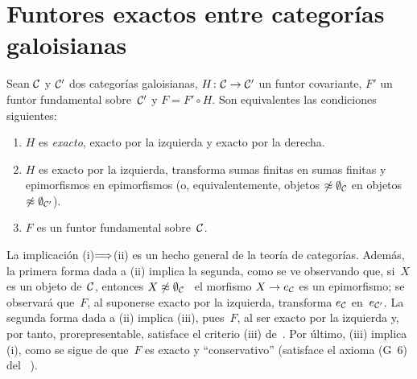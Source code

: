 
\section{Funtores exactos entre categorías galoisianas}
\label{V.6}

\begin{proposition}
\label{V.6.1}
Sean $\cal{C}$ y $\cal{C'}$ dos categorías galoisianas,
$H\colon \cal{C}\to \cal{C'}$ un funtor covariante, $F'$ un funtor
fundamental sobre~$\cal{C'}$ y $F=F'\circ H$. Son equivalentes las
condiciones siguientes:
\begin{enumerate}
\item[(i)] $H$ es \emph{exacto}, \ie exacto por la izquierda y exacto
por la derecha.
\item[(ii)] $H$ es exacto por la izquierda, transforma sumas finitas en
sumas finitas y epimorfismos en epimorfismos (o, equivalentemente,
objetos $\not\approx\emptyset_{\cal C}$ en objetos
$\not\approx\emptyset_{\cal C'}$).
\item[(iii)] $F$ es un funtor fundamental sobre~$\cal C$.
\end{enumerate}
\end{proposition}

La implicación (i)$\To$(ii) es un hecho general de la teoría de categorías. Además,
la primera forma dada a (ii) implica la segunda, como se ve observando que,
si~$X$ es un objeto de~$\cal C$, entonces
$X\not\approx\emptyset_{\cal C}$ \sss\ el morfismo
$X\to e_{\cal C}$ es un epimorfismo; se observará que~$F$, al suponerse
exacto por la izquierda, transforma $e_{\cal C}$ en~$e_{\cal C'}$. La
segunda forma dada a (ii) implica (iii), pues~$F$, al ser exacto por la
izquierda y, por tanto, prorepresentable, satisface el criterio (iii)
de~. Por último, (iii) implica (i), como se sigue de que~$F$ es
exacto y ``conservativo'' (\ie satisface el axioma (G~6) del
\No~).

